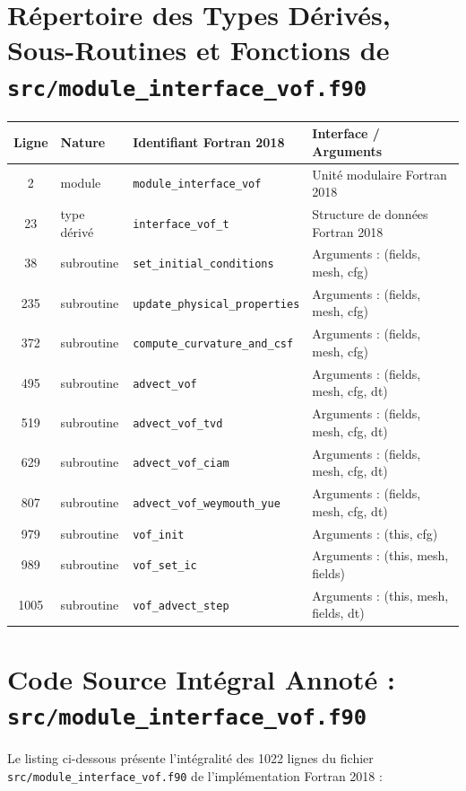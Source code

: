 \documentclass[10pt,a4paper,oneside]{book}
\begin{document}
\section{Répertoire des Types Dérivés, Sous-Routines et Fonctions de \texttt{src/module\_interface\_vof.f90}}
\begin{center}\small
\begin{tabular}{clll}
\toprule
\textbf{Ligne} & \textbf{Nature} & \textbf{Identifiant Fortran 2018} & \textbf{Interface / Arguments} \\
\midrule
2 & module & \texttt{module\_interface\_vof} & Unité modulaire Fortran 2018 \\
23 & type dérivé & \texttt{interface\_vof\_t} & Structure de données Fortran 2018 \\
38 & subroutine & \texttt{set\_initial\_conditions} & Arguments : (fields, mesh, cfg) \\
235 & subroutine & \texttt{update\_physical\_properties} & Arguments : (fields, mesh, cfg) \\
372 & subroutine & \texttt{compute\_curvature\_and\_csf} & Arguments : (fields, mesh, cfg) \\
495 & subroutine & \texttt{advect\_vof} & Arguments : (fields, mesh, cfg, dt) \\
519 & subroutine & \texttt{advect\_vof\_tvd} & Arguments : (fields, mesh, cfg, dt) \\
629 & subroutine & \texttt{advect\_vof\_ciam} & Arguments : (fields, mesh, cfg, dt) \\
807 & subroutine & \texttt{advect\_vof\_weymouth\_yue} & Arguments : (fields, mesh, cfg, dt) \\
979 & subroutine & \texttt{vof\_init} & Arguments : (this, cfg) \\
989 & subroutine & \texttt{vof\_set\_ic} & Arguments : (this, mesh, fields) \\
1005 & subroutine & \texttt{vof\_advect\_step} & Arguments : (this, mesh, fields, dt) \\
\bottomrule
\end{tabular}
\end{center}

\section{Code Source Intégral Annoté : \texttt{src/module\_interface\_vof.f90}}
Le listing ci-dessous présente l'intégralité des 1022 lignes du fichier \texttt{src/module\_interface\_vof.f90} de l'implémentation Fortran 2018 :
\end{document}
